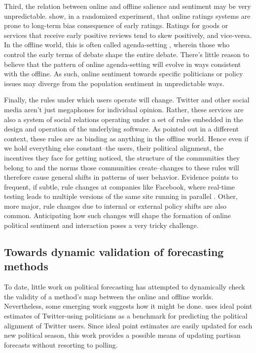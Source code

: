 \documentclass{article}
\begin{document}
Third, the relation between online and offline salience and sentiment
may be very unpredictable. \cite{Muchnik09082013} show, in a
randomized experiment, that online ratings systems are prone to
long-term bias consequence of early ratings. Ratings for goods or
services that receive early positive reviews tend to skew positively,
and vice-versa. In the offline world, this is often called
agenda-setting \citep{scheufele2007framing,scheufele2000agenda},
wherein those who control the early terms of debate shape the entire
debate. There's little reason to believe that the pattern of online
agenda-setting will evolve in ways consistent with the offline. As
such, online sentiment towards specific politicians or policy issues
may diverge from the population sentiment in unpredictable ways.

Finally, the rules under which users operate will change. Twitter and
other social media aren't just megaphones for individual
opinion. Rather, these services are also a system of social relations
operating under a set of rules embedded in the design and operation of
the underlying software. As \cite{lessig1999code} pointed out in a
different context, these rules are as binding as anything in the
offline world. Hence even if we hold everything else constant--the
users, their political alignment, the incentives they face for getting
noticed, the structure of the communities they belong to and the norms
those communities create--changes to these rules will therefore cause
general shifts in patterns of user behavior. Evidence points to
frequent, if subtle, rule changes at companies like Facebook, where
real-time testing leads to multiple versions of the same site running
in parallel \citep{vance2012facebook}. Other, more major, rule changes
due to internal or external policy shifts are also
common. Anticipating how such changes will shape the formation of
online political sentiment and interaction poses a very tricky
challenge. 

\subsection{Towards dynamic validation of forecasting methods}
\label{sec:towards-dynam-valid}

To date, little work on political forecasting has attempted to
dynamically check the validity of a method's map between the online
and offline worlds. Nevertheless, some emerging work suggests how it
might be done. \cite{barbera2012birds} uses ideal point estimates
\citep{poole1985spatial} of Twitter-using politicians as a benchmark
for predicting the political alignment of Twitter users. Since ideal
point estimates are easily updated for each new political season, this
work provides a possible means of updating partisan forecasts without
resorting to polling.
\end{document}

